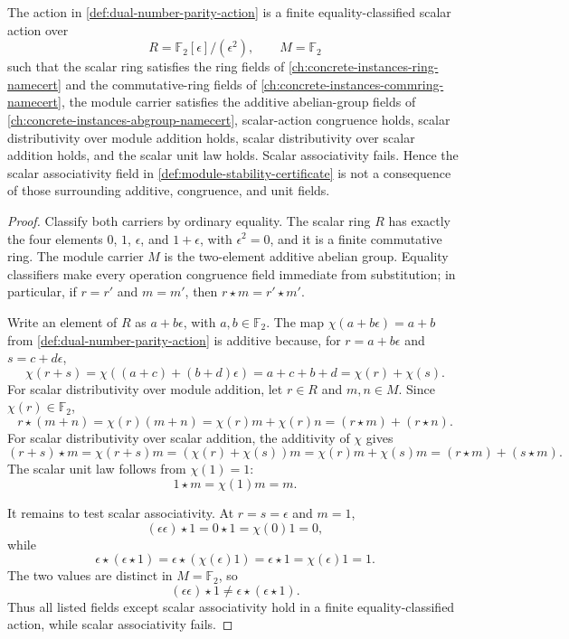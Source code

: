 \begin{theorem}
\label{thm:scalar-associativity-independent-additive-unit-action-laws}
The action in \autoref{def:dual-number-parity-action} is a finite equality-classified scalar action over
$$
R=\mathbb F_2[\epsilon]/(\epsilon^2),\qquad M=\mathbb F_2
$$
such that the scalar ring satisfies the ring fields of \autoref{ch:concrete-instances-ring-namecert} and the commutative-ring fields of \autoref{ch:concrete-instances-commring-namecert}, the module carrier satisfies the additive abelian-group fields of \autoref{ch:concrete-instances-abgroup-namecert}, scalar-action congruence holds, scalar distributivity over module addition holds, scalar distributivity over scalar addition holds, and the scalar unit law holds. Scalar associativity fails. Hence the scalar associativity field in \autoref{def:module-stability-certificate} is not a consequence of those surrounding additive, congruence, and unit fields.
\end{theorem}
\begin{proof}
Classify both carriers by ordinary equality. The scalar ring $R$ has exactly the four elements $0$, $1$, $\epsilon$, and $1+\epsilon$, with $\epsilon^2=0$, and it is a finite commutative ring. The module carrier $M$ is the two-element additive abelian group. Equality classifiers make every operation congruence field immediate from substitution; in particular, if $r=r'$ and $m=m'$, then $r\star m=r'\star m'$.

Write an element of $R$ as $a+b\epsilon$, with $a,b\in\mathbb F_2$. The map $\chi(a+b\epsilon)=a+b$ from \autoref{def:dual-number-parity-action} is additive because, for $r=a+b\epsilon$ and $s=c+d\epsilon$,
$$
\chi(r+s)=\chi((a+c)+(b+d)\epsilon)=a+c+b+d=\chi(r)+\chi(s).
$$
For scalar distributivity over module addition, let $r\in R$ and $m,n\in M$. Since $\chi(r)\in\mathbb F_2$,
$$
r\star(m+n)=\chi(r)(m+n)=\chi(r)m+\chi(r)n=(r\star m)+(r\star n).
$$
For scalar distributivity over scalar addition, the additivity of $\chi$ gives
$$
(r+s)\star m=\chi(r+s)m=(\chi(r)+\chi(s))m=\chi(r)m+\chi(s)m=(r\star m)+(s\star m).
$$
The scalar unit law follows from $\chi(1)=1$:
$$
1\star m=\chi(1)m=m.
$$

It remains to test scalar associativity. At $r=s=\epsilon$ and $m=1$,
$$
(\epsilon\epsilon)\star 1=0\star 1=\chi(0)1=0,
$$
while
$$
\epsilon\star(\epsilon\star 1)=\epsilon\star(\chi(\epsilon)1)=\epsilon\star 1=\chi(\epsilon)1=1.
$$
The two values are distinct in $M=\mathbb F_2$, so
$$
(\epsilon\epsilon)\star 1\neq \epsilon\star(\epsilon\star 1).
$$
Thus all listed fields except scalar associativity hold in a finite equality-classified action, while scalar associativity fails.
\end{proof}

